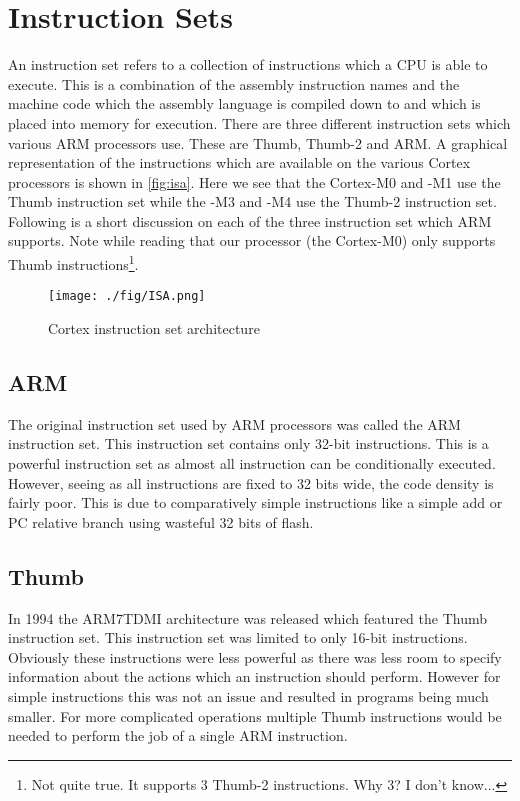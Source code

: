 \chapter{Instruction Sets}
\label{sec:instruction_sets}
An instruction set refers to a collection of instructions which a CPU is able to execute. This is a combination of the assembly instruction names and the machine code which the assembly language is compiled down to and which is placed into memory for execution. There are three different instruction sets which various ARM processors use. These are Thumb, Thumb-2 and ARM. A graphical representation of the instructions which are available on the various Cortex processors is shown in \autoref{fig:isa}. Here we see that the Cortex-M0 and -M1 use the Thumb instruction set while the -M3 and -M4 use the Thumb-2 instruction set. Following is a short discussion on each of the three instruction set which ARM supports. Note while reading that our processor (the Cortex-M0) only supports Thumb instructions\footnote{Not quite true. It supports 3 Thumb-2 instructions. Why 3? I don't know...}.

\begin{figure}
  \centering
  \texttt{[image: ./fig/ISA.png]}
  \caption{Cortex instruction set architecture}
  \label{fig:isa}
\end{figure}

\section{ARM}
The original instruction set used by ARM processors was called the ARM instruction set. This instruction set contains only 32-bit instructions. This is a powerful instruction set as almost all instruction can be conditionally executed. However, seeing as all instructions are fixed to 32 bits wide, the code density is fairly poor. This is due to comparatively simple instructions like a simple add or PC relative branch using wasteful 32 bits of flash.

\section{Thumb}
In 1994 the ARM7TDMI architecture was released which featured the Thumb instruction set. This instruction set was limited to only 16-bit instructions. Obviously these instructions were less powerful as there was less room to specify information about the actions which an instruction should perform. However for simple instructions this was not an issue and resulted in programs being much smaller. For more complicated operations multiple Thumb instructions would be needed to perform the job of a single ARM instruction. 

